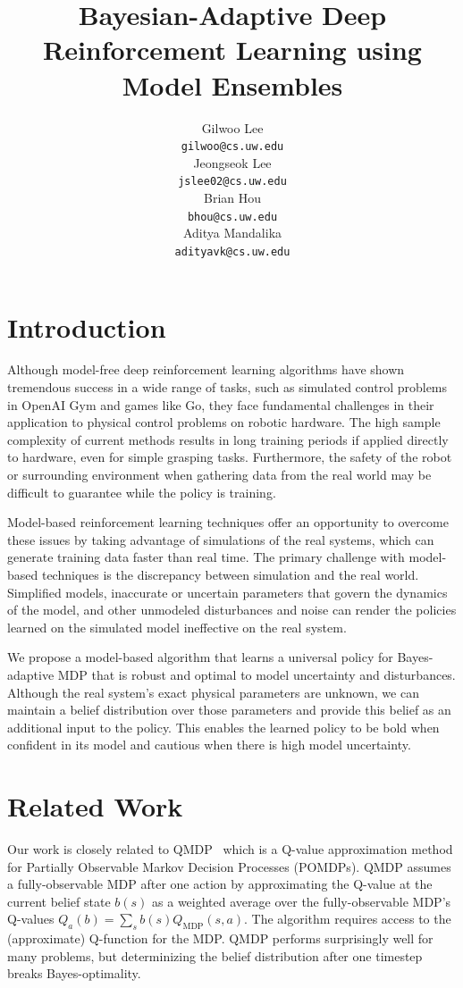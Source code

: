 \documentclass{article}
\title{Bayesian-Adaptive Deep Reinforcement Learning using Model Ensembles}
\author{
  Gilwoo Lee \\ \texttt{gilwoo@cs.uw.edu} \\
  \And
  Jeongseok Lee \\ \texttt{jslee02@cs.uw.edu} \\
  \And
  Brian Hou \\ \texttt{bhou@cs.uw.edu} \\
  \And
  Aditya Mandalika \\ \texttt{adityavk@cs.uw.edu} \\
}
\begin{document}
\maketitle


\section{Introduction}
Although model-free deep reinforcement learning algorithms have shown tremendous success in a wide range of tasks, such as simulated control problems in OpenAI Gym\cite{openai-gym} and games like Go\cite{alphago}, they face fundamental challenges in their application to physical control problems on robotic hardware.
The high sample complexity of current methods results in long training periods if applied directly to hardware, even for simple grasping tasks\cite{levine2016armfarm}.
Furthermore, the safety of the robot or surrounding environment when gathering data from the real world may be difficult to guarantee while the policy is training.

Model-based reinforcement learning techniques offer an opportunity to overcome these issues by taking advantage of simulations of the real systems, which can generate training data faster than real time.
The primary challenge with model-based techniques is the discrepancy between simulation and the real world.
Simplified models, inaccurate or uncertain parameters that govern the dynamics of the model, and other unmodeled disturbances and noise can render the policies learned on the simulated model ineffective on the real system.

We propose a model-based algorithm that learns a universal policy for Bayes-adaptive MDP that is robust and optimal to model uncertainty and disturbances. Although the real system's exact physical parameters are unknown, we can maintain a belief distribution over those parameters and provide this belief as an additional input to the policy.
This enables the learned policy to be bold when confident in its model and cautious when there is high model uncertainty.

\section{Related Work}
Our work is closely related to QMDP~\cite{littman1995learning, karkus2017qmdp} which is a Q-value approximation method for Partially Observable Markov Decision Processes (POMDPs).
QMDP assumes a fully-observable MDP after one action by approximating the Q-value at the current belief state $b(s)$ as a weighted average over the fully-observable MDP's Q-values $Q_a(b) = \sum_s b(s)Q_{\text{MDP}}(s, a)$.
The algorithm requires access to the (approximate) Q-function for the MDP.
QMDP performs surprisingly well for many problems, but determinizing the belief distribution after one timestep breaks Bayes-optimality.
\end{document}
